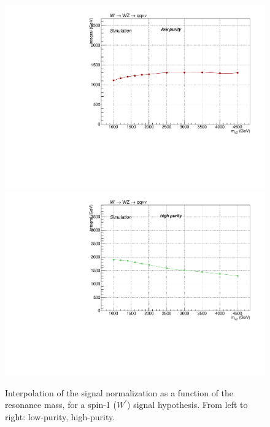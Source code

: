 \begin{figure}[!htb]
  \centering
    \includegraphics[width=.495\textwidth]{plotsAlpha_tesi/XVZnnlp/XWZInv_SignalNorm.pdf}
    \includegraphics[width=.495\textwidth]{plotsAlpha_tesi/XVZnnhp/XWZInv_SignalNorm.pdf}
  \caption{Interpolation of the signal normalization as a function of the resonance mass, for a spin-1 ($W^{'}$) signal hypothesis. From left to right: low-purity, high-purity.}
  \label{fig:XWZ_SignalNorm}
\end{figure}


\clearpage

